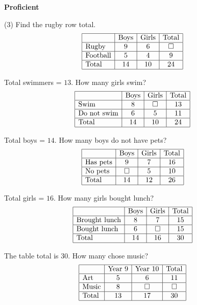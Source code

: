 \documentclass[17pt,a4paper,landscape]{extarticle}
\begin{document}
\sffamily
\boldmath

\boldmath

{\LARGE \textbf{Proficient}}
\begin{tasks}(3)
\task Find the rugby row total.
\[
\begin{array}{|l|c|c|c|}
\hline
 & \text{Boys} & \text{Girls} & \text{Total} \\\hline
\text{Rugby} & 9 & 6 & \square \\\hline
\text{Football} & 5 & 4 & 9 \\\hline
\text{Total} & 14 & 10 & 24 \\\hline
\end{array}
\]

\task Total swimmers = \mbox{$13$}. How many girls swim?
\[
\begin{array}{|l|c|c|c|}
\hline
 & \text{Boys} & \text{Girls} & \text{Total} \\\hline
\text{Swim} & 8 & \square & 13 \\\hline
\text{Do not swim} & 6 & 5 & 11 \\\hline
\text{Total} & 14 & 10 & 24 \\\hline
\end{array}
\]

\task Total boys = \mbox{$14$}. How many boys do not have pets?
\[
\begin{array}{|l|c|c|c|}
\hline
 & \text{Boys} & \text{Girls} & \text{Total} \\\hline
\text{Has pets} & 9 & 7 & 16 \\\hline
\text{No pets} & \square & 5 & 10 \\\hline
\text{Total} & 14 & 12 & 26 \\\hline
\end{array}
\]

\task Total girls = \mbox{$16$}. How many girls bought lunch?
\[
\begin{array}{|l|c|c|c|}
\hline
 & \text{Boys} & \text{Girls} & \text{Total} \\\hline
\text{Brought lunch} & 8 & 7 & 15 \\\hline
\text{Bought lunch} & 6 & \square & 15 \\\hline
\text{Total} & 14 & 16 & 30 \\\hline
\end{array}
\]

\task The table total is \mbox{$30$}. How many chose music?
\[
\begin{array}{|l|c|c|c|}
\hline
 & \text{Year 9} & \text{Year 10} & \text{Total} \\\hline
\text{Art} & 5 & 6 & 11 \\\hline
\text{Music} & 8 & \square & \square \\\hline
\text{Total} & 13 & 17 & 30 \\\hline
\end{array}
\]


\end{tasks}
\end{document}
